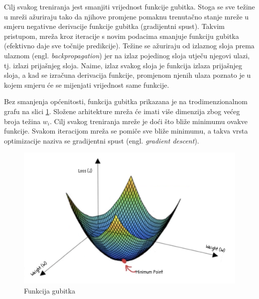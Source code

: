 

Cilj svakog treniranja jest smanjiti vrijednost funkcije gubitka. Stoga se sve težine u mreži
ažuriraju tako da njihove promjene pomaknu trenutačno stanje mreže u smjeru negativne derivacije
funkcije gubitka (gradijentni spust). Takvim pristupom, mreža kroz iteracije s novim podacima smanjuje funkciju gubitka
(efektivno daje sve točnije predikcije). Težine se ažuriraju od izlaznog sloja prema ulaznom 
(engl. \textit{backpropagation}) jer na izlaz pojedinog sloja utječu njegovi ulazi, tj. izlazi prijašnjeg
sloja. Naime, izlaz svakog sloja je funkcija izlaza prijašnjeg sloja, a kad se izračuna derivacija
funkcije, promjenom njenih ulaza poznato je u kojem smjeru će se mijenjati vrijednost same funkcije.



Bez smanjenja općenitosti, funkcija gubitka prikazana je na trodimenzionalnom grafu
na slici \ref{pic:descent}. Složene arhitekture mreža će imati više dimenzija zbog većeg broja
težina \( w_i \). Cilj svakog treniranja mreže je doći što bliže minimumu ovakve funkcije.
Svakom iteracijom mreža se pomiče sve bliže minimumu, a takva vrsta optimizacije naziva se
gradijentni spust (engl. \textit{gradient descent}).

\begin{figure}[htb]
  \centering
  \includegraphics[width=0.5\linewidth]{Chapters/neuronska_mreza/descent.png} 
  \caption{Funkcija gubitka \cite{desc}}
  \label{pic:descent}
\end{figure}






